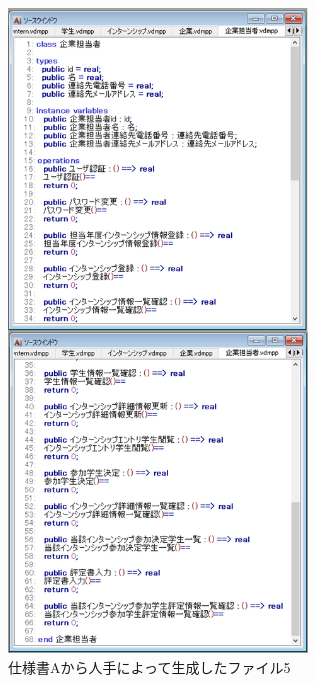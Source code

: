 \begin{figure}[tp]
    \begin{center}
    \includegraphics[width=300]{image/speA_vdm5.PNG}
    \caption{仕様書Aから人手によって生成したファイル5}
    \label{fig:speA_vdm5}
    \end{center}
\end{figure}

